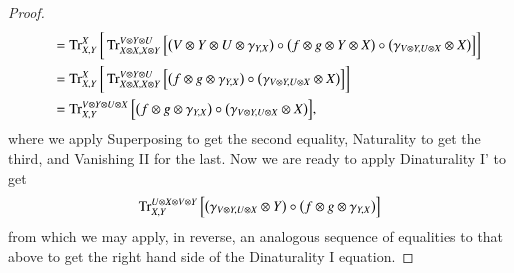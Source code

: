 \documentclass[12pt,oneside,article,draft]{memoir}
\begin{document}
\begin{enumerate}
{\begin{proof}
\begin{align*}
  &\quad=\operatorname{Tr}^X_{X,Y}\bigg[\operatorname{Tr}^{V\otimes Y\otimes U}_{X\otimes X,X\otimes Y}\Big[\big(V\otimes Y\otimes U\otimes \gamma_{Y,X}\big)\circ\big(f\otimes g\otimes Y\otimes X\big)\circ\big(\gamma_{V\otimes Y,U\otimes X}\otimes X\big)\Big]\bigg]\\
  &\quad=\operatorname{Tr}^X_{X,Y}\bigg[\operatorname{Tr}^{V\otimes Y\otimes U}_{X\otimes X,X\otimes Y}\Big[\big(f\otimes g\otimes \gamma_{Y,X}\big)\circ\big(\gamma_{V\otimes Y,U\otimes X}\otimes X\big)\Big]\bigg]\\
  &\quad=\operatorname{Tr}^{V\otimes Y\otimes U\otimes X}_{X,Y}\Big[\big(f\otimes g\otimes \gamma_{Y,X}\big)\circ\big(\gamma_{V\otimes Y,U\otimes X}\otimes X\big)\Big],
 \end{align*}
 where we apply Superposing to get the second equality, Naturality to get the third, and Vanishing II for the last.
 Now we are ready to apply Dinaturality I' to get
 \begin{align*}
  \operatorname{Tr}^{U\otimes X\otimes V\otimes Y}_{X,Y}\Big[\big(\gamma_{V\otimes Y,U\otimes X}\otimes Y\big)\circ\big(f\otimes g\otimes \gamma_{Y,X}\big)\Big]
 \end{align*}
 from which we may apply, in reverse, an analogous sequence of equalities to that above to get the right hand side of the Dinaturality I equation.
\end{proof}}
\end{enumerate}
\end{document}
